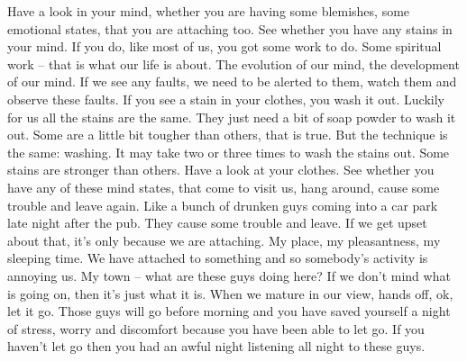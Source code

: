 \documentclass[letterpaper,10pt,english]{sphinxmanual}
\begin{document}
\sphinxAtStartPar
Have  a  look  in  your  mind,  whether  you  are  having  some  blemishes,
some emotional states, that you are attaching too. See whether you have any
stains in your mind. If you do, like most of us, you got some work to do. Some
spiritual work – that is what our life is about. The evolution of our mind, the
development of our mind. If we see any faults, we need to be alerted to them,
watch them and observe these faults. If you see a stain in your clothes, you
wash it out. Luckily for us all the stains are the same. They just need a bit of
soap powder to wash it out. Some are a little bit tougher than others, that is
true. But the technique is the same: washing. It may take two or three times
to wash the stains out. Some stains are stronger than others. Have a look at
your clothes. See whether you have any of these mind states, that come to
visit us, hang around, cause some trouble and leave again. Like a bunch of
drunken  guys  coming  into  a  car  park  late  night  after  the  pub. They  cause
some trouble and leave. If we get upset about that, it’s only because we are
attaching. My place, my pleasantness, my sleeping time. We have attached
to something and so somebody’s activity is annoying us. My town – what are
these guys doing here? If we don’t mind what is going on, then it’s just what
it is. When we mature in our view, hands off, ok, let it go. Those guys will
go before morning and you have saved yourself a night of stress, worry and
discomfort because you have been able to let go. If you haven’t let go then
you had an awful night listening all night to these guys.
\end{document}

